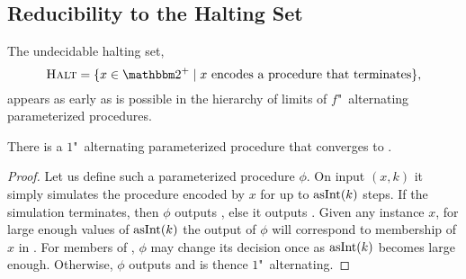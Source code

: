 \subsection{Reducibility to the Halting Set}
The undecidable halting set,
\begin{equation*}
  \pr{Halt} \deq \{x \in \binary^+ \st \text{$x$ encodes a procedure that terminates}\},
\end{equation*}
appears as early as is possible in the hierarchy of limits of $f$"~alternating parameterized procedures.
\begin{lemma}
\label{lem:one_halting}%
  There is a $1$"~alternating parameterized procedure that converges to .
\end{lemma}
\begin{proof}
  Let us define such a parameterized procedure $\phi$.
  On input $(x, k)$ it simply simulates the procedure encoded by $x$ for up to $\operatorname{asInt}(k)$ steps.
  If the simulation terminates, then $\phi$ outputs , else it outputs .
  Given any instance $x$, for large enough values of $\operatorname{asInt}(k)$ the output of $\phi$ will correspond to membership of $x$ in .
  For members of , $\phi$ may change its decision once as $\operatorname{asInt}(k)$ becomes large enough.
  Otherwise, $\phi$ outputs  and is thence $1$"~alternating.
\end{proof}

